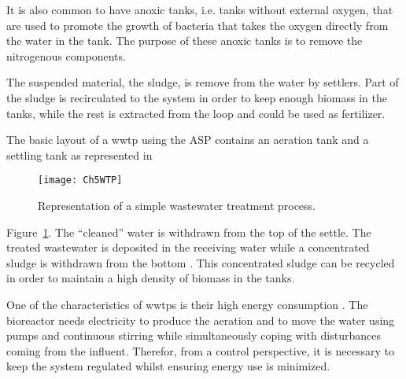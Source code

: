 It is also common to have anoxic tanks, i.e. tanks without external oxygen, that are used to promote the growth of bacteria that takes the oxygen directly from the water in the tank. The purpose of these anoxic tanks is to remove the nitrogenous components.

The suspended material, the sludge, is remove from the water by settlers. Part of the sludge is recirculated to the system in order to keep enough biomass in the tanks, while the rest is extracted from the loop and could be used as fertilizer.

The basic layout of a \gls{wwtp} using the ASP contains an aeration tank and a settling tank as represented in %
%
\begin{figure}[tb]
	\centering
	\texttt{[image: Ch5WTP]}
	\caption{Representation of a simple wastewater treatment process.}
	\label{sec:Ch5WTP}
\end{figure}
%
Figure~\ref{sec:Ch5WTP}. The ``cleaned'' water is withdrawn from the top of the settle. The treated wastewater is deposited in the receiving water while a concentrated sludge is withdrawn from the bottom \citep{Henze1997}. This concentrated sludge can be recycled in order to maintain a high density of biomass in the tanks.

One of the characteristics of \gls{wwtp}s is their high energy consumption \citep{Longo2016}. The bioreactor needs electricity to produce the aeration and  to move the water using pumps and continuous stirring while simultaneously coping with disturbances coming from the influent. Therefor, from a control perspective, it is necessary to keep the system regulated whilst ensuring energy use is minimized.

